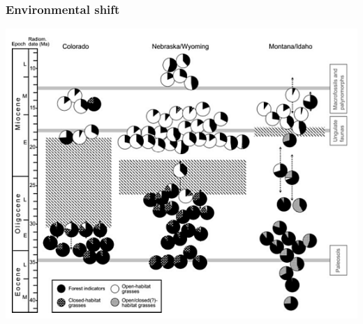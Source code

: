 \documentclass{beamer}
\begin{document}
\begin{frame}
  \frametitle{Environmental shift}
  \begin{center}
    \includegraphics[width=\textwidth,height=0.8\textheight,keepaspectratio=true]{figure/stromberg_na}
  \end{center}

\end{frame}

\end{document}
